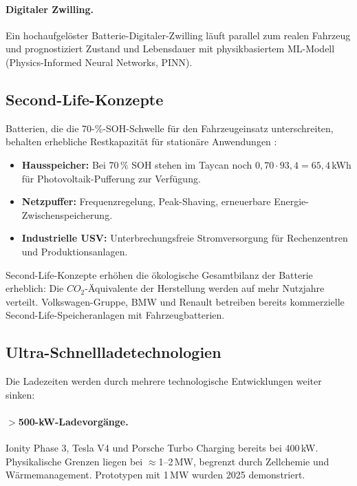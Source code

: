 ﻿\documentclass[a4paper,12pt]{article}
\theoremstyle{definition}
\begin{document}
\paragraph{Digitaler Zwilling.}
Ein hochaufgel\"oster Batterie-Digitaler-Zwilling l\"auft parallel zum
realen Fahrzeug und prognostiziert Zustand und Lebensdauer mit
physikbasiertem ML-Modell (Physics-Informed Neural Networks, PINN).

\subsection{Second-Life-Konzepte}

Batterien, die die 70-\%-SOH-Schwelle f\"ur den Fahrzeugeinsatz unterschreiten,
behalten erhebliche Restkapazit\"at f\"ur station\"are Anwendungen \cite{Martinez2018}:

\begin{itemize}
  \item \textbf{Hausspeicher:} Bei 70\,\% SOH stehen im Taycan noch
    $0{,}70 \cdot 93{,}4 = 65{,}4$\,kWh f\"ur Photovoltaik-Pufferung zur Verf\"ugung.
  \item \textbf{Netzpuffer:} Frequenzregelung, Peak-Shaving,
    erneuerbare Energie-Zwischenspeicherung.
  \item \textbf{Industrielle USV:} Unterbrechungsfreie Stromversorgung
    f\"ur Rechenzentren und Produktionsanlagen.
\end{itemize}

Second-Life-Konzepte erh\"ohen die \"okologische Gesamtbilanz der Batterie
erheblich: Die $CO_2$-\"Aquivalente der Herstellung werden auf mehr Nutzjahre
verteilt. Volkswagen-Gruppe, BMW und Renault betreiben bereits kommerzielle
Second-Life-Speicheranlagen mit Fahrzeugbatterien.

\subsection{Ultra-Schnellladetechnologien}

Die Ladezeiten werden durch mehrere technologische Entwicklungen weiter sinken:

\paragraph{$>$500-kW-Ladevorg\"ange.}
Ionity Phase 3, Tesla V4 und Porsche Turbo Charging bereits bei 400\,kW.
Physikalische Grenzen liegen bei $\approx$1--2\,MW, begrenzt durch
Zellchemie und W\"armemanagement. Prototypen mit 1\,MW wurden 2025 demonstriert.
\end{document}
